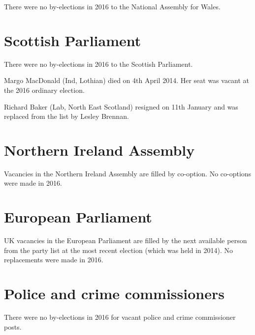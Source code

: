 \documentclass[a4paper,openany]{book}
\begin{document}
There were no by-elections in 2016 to the National Assembly for Wales.

\section{Scottish Parliament}

There were no by-elections in 2016 to the Scottish Parliament.

Margo MacDonald (Ind, Lothian) died on 4th April 2014.  Her seat was vacant at the 2016 ordinary election.

Richard Baker (Lab, North East Scotland) resigned on 11th January and was replaced from the list by Lesley Brennan.

\section{Northern Ireland Assembly}

Vacancies in the Northern Ireland Assembly are filled by co-option.  No co-options were made in 2016.


\section{European Parliament}

UK vacancies in the European Parliament are filled by the next available person from the party list at the most recent election (which was held in 2014). 
No replacements were made in 2016.

\section{Police and crime commissioners}

There were no by-elections in 2016 for vacant police and crime commissioner posts.
\end{document}
